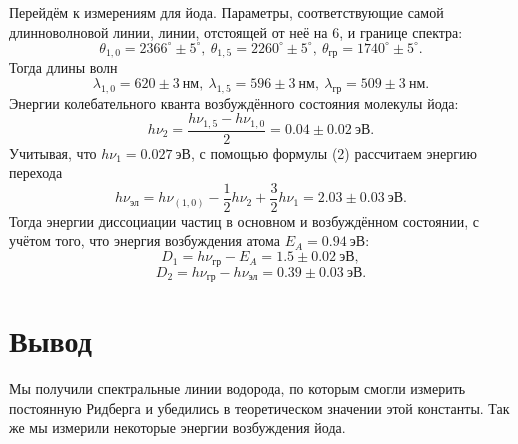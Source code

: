 \documentclass[a4paper,12pt]{article}
\begin{document}
Перейдём к измерениям для йода. Параметры, соответствующие самой длинноволновой линии, линии, отстоящей от неё на 6, и границе спектра:
\[\theta_{1,0} = 2366^\circ \pm 5^\circ,~\theta_{1,5} = 2260^\circ \pm 5^\circ,~\theta_{\text{гр}} = 1740^\circ \pm 5^\circ.\]
Тогда длины волн
\[\lambda_{1,0} = 620 \pm 3~\text{нм},~\lambda_{1,5} = 596 \pm 3~\text{нм},~\lambda_{\text{гр}} = 509 \pm 3~\text{нм}.\]
Энергии колебательного кванта возбуждённого состояния молекулы йода:
\[h\nu_{2} = \dfrac{h\nu_{1,5} - h\nu_{1,0}}{2} = 0.04 \pm 0.02~\text{эВ}.\]
Учитывая, что $h\nu_1 = 0.027~\text{эВ}$, с помощью формулы (2) рассчитаем энергию перехода
\[h\nu_{\text{эл}} = h\nu_{(1,0)} - \dfrac{1}{2} h\nu_2 + \dfrac{3}{2} h\nu_1 = 2.03 \pm 0.03~\text{эВ}.\]
Тогда энергии диссоциации частиц в основном и возбуждённом состоянии, с учётом того, что энергия возбуждения атома $E_A = 0.94~\text{эВ}$:
\[D_1 = h\nu_{\text{гр}} - E_A = 1.5 \pm 0.02~\text{эВ},\]
\[D_2 = h\nu_{\text{гр}} - h\nu_{\text{эл}} = 0.39 \pm 0.03~\text{эВ}.\]
\section*{Вывод}
Мы получили спектральные линии водорода, по которым смогли измерить постоянную Ридберга и убедились в теоретическом значении этой константы. Так же мы измерили некоторые энергии возбуждения йода.
\end{document}
